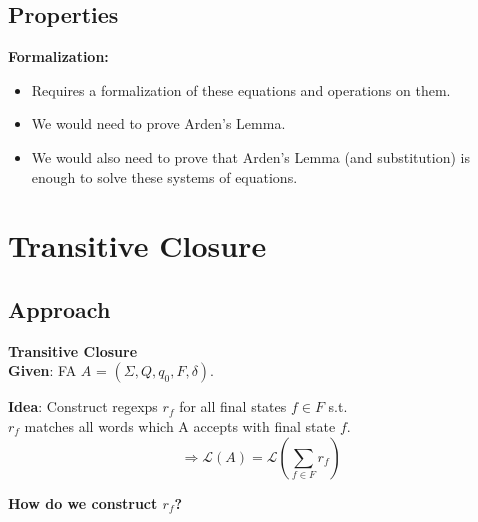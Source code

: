 \documentclass{beamer}
\begin{document}
\subsection*{Properties}
\begin{frame}
    \textbf{Formalization:} \\
    \begin{itemize}
        \item
            Requires a formalization of these equations and operations on them. 
        \item
            We would need to prove Arden's Lemma.
        \item
            We would also need to prove that Arden's Lemma (and substitution) is enough to solve these systems of equations.
    \end{itemize} 
\end{frame}

\section{Transitive Closure}
\subsection*{Approach}
\begin{frame}

    \large{\textbf{Transitive Closure}} \\

    \textbf{Given}: FA $A$ = $(\Sigma, Q, q_0, F, \delta)$.

    \textbf{Idea}: Construct regexps $r_f$ for all final states $f \in F$ s.t. \\$r_f$ matches all words which A accepts with final state $f$. \\

    \begin{equation*}
        \, \Rightarrow \mathcal{L}(A) = \mathcal{L}(\sum\limits_{f \in F} r_f)
    \end{equation*}

    \vspace{5 mm}

    \textbf{How do we construct $r_f$?} 

\end{frame}
\end{document}
